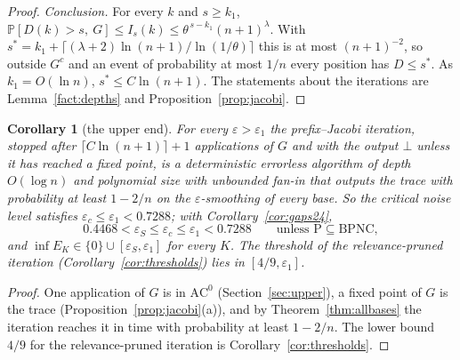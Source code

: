 \documentclass[11pt]{amsart}
\newtheorem{corollary}[theorem]{Corollary}
\theoremstyle{definition}
\theoremstyle{remark}
\newcommand{\eps}{\varepsilon}
\newcommand{\PP}{\mathbb{P}}
\begin{document}
\begin{proof}
\emph{Conclusion.} For every $k$ and $s\ge k_1$,
$\PP[D(k)>s,\ G]\le I_s(k)\le\theta^{\,s-k_1}(n+1)^\lambda$. With
$s^*=k_1+\lceil(\lambda+2)\ln(n+1)/\ln(1/\theta)\rceil$ this is at most $(n+1)^{-2}$, so outside
$G^c$ and an event of probability at most $1/n$ every position has $D\le s^*$. As
$k_1=O(\ln n)$, $s^*\le C\ln(n+1)$. The statements about the iterations are
Lemma~\ref{fact:depths} and Proposition~\ref{prop:jacobi}.
\end{proof}

\begin{corollary}[the upper end]\label{cor:upperend}
For every $\eps>\eps_1$ the prefix--Jacobi iteration, stopped after $\lceil C\ln(n+1)\rceil+1$
applications of $G$ and with the output $\bot$ unless it has reached a fixed point, is a
deterministic errorless algorithm of depth $O(\log n)$ and polynomial size with unbounded fan-in
that outputs the trace with probability at least $1-2/n$ on the $\eps$-smoothing of every base. So
the critical noise level satisfies $\eps_c\le\eps_1<0.7288$; with Corollary~\ref{cor:gaps24},
\[
0.4468<\eps_S\le\eps_c\le\eps_1<0.7288\qquad\text{unless }\mathrm P\subseteq\mathrm{BPNC},
\]
and $\inf E_K\in\{0\}\cup[\eps_S,\eps_1]$ for every $K$. The threshold of the relevance-pruned
iteration (Corollary~\ref{cor:thresholds}) lies in $[4/9,\eps_1]$.
\end{corollary}

\begin{proof}
One application of $G$ is in $\mathrm{AC}^0$ (Section~\ref{sec:upper}), a fixed point of $G$ is the
trace (Proposition~\ref{prop:jacobi}(a)), and by Theorem~\ref{thm:allbases} the iteration reaches
it in time with probability at least $1-2/n$. The lower bound $4/9$ for the relevance-pruned
iteration is Corollary~\ref{cor:thresholds}.
\end{proof}
\end{document}
